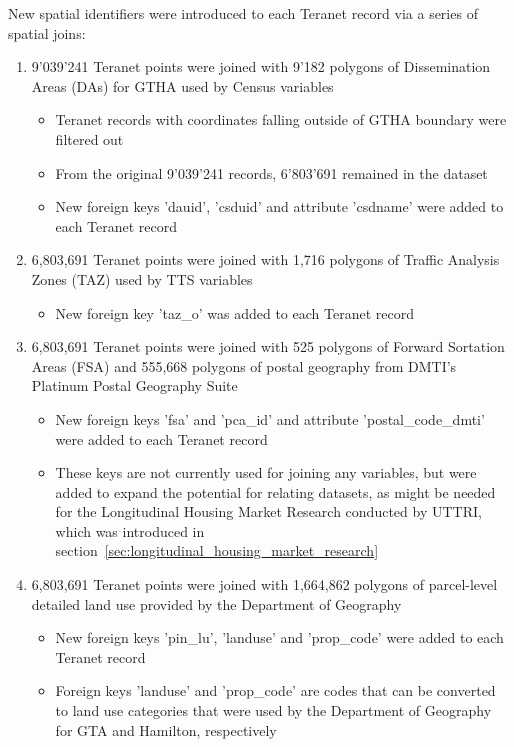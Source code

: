 New spatial identifiers were introduced to each Teranet record via a series of spatial joins:
\begin{enumerate}
    \item 9'039'241 Teranet points were joined with 9'182 polygons of Dissemination Areas (DAs) for GTHA used by Census variables
    \begin{itemize}
        \item Teranet records with coordinates falling outside of GTHA boundary were filtered out
        \item From the original 9'039'241 records, 6'803'691 remained in the dataset
        \item New foreign keys 'dauid', 'csduid' and attribute 'csdname' were added to each Teranet record
    \end{itemize}
    \item 6,803,691 Teranet points were joined with 1,716 polygons of Traffic Analysis Zones (TAZ) used by TTS variables
    \begin{itemize}
        \item New foreign key 'taz\_o' was added to each Teranet record
    \end{itemize}
    \item 6,803,691 Teranet points were joined with 525 polygons of Forward Sortation Areas (FSA) and 555,668 polygons of postal geography from DMTI's Platinum Postal Geography Suite
    \begin{itemize}
        \item New foreign keys 'fsa' and 'pca\_id' and attribute 'postal\_code\_dmti' were added to each Teranet record
        \item These keys are not currently used for joining any variables, but were added to expand the potential for relating datasets, as might be needed for the Longitudinal Housing Market Research conducted by UTTRI, which was introduced in section~\ref{sec:longitudinal_housing_market_research}
    \end{itemize}
    \item 6,803,691 Teranet points were joined with 1,664,862 polygons of parcel-level detailed land use provided by the Department of Geography
    \begin{itemize}
        \item New foreign keys 'pin\_lu', 'landuse' and 'prop\_code' were added to each Teranet record
        \item Foreign keys 'landuse' and 'prop\_code' are codes that can be converted to land use categories that were used by the Department of Geography for GTA and Hamilton, respectively

\end{itemize}
\end{enumerate}
